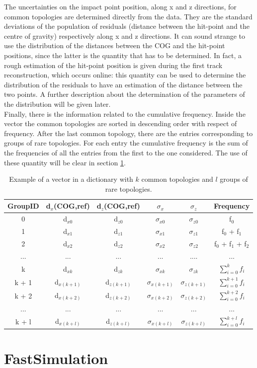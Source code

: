 The uncertainties on the impact point position, along x and z directions, for common topologies are determined directly from the data. They are the standard deviations of the population of residuals (distance between the hit-point and the centre of gravity) respectively along x and z directions. It can sound strange to use the distribution of the distances between the COG and the hit-point positions, since the latter is the quantity that has to be determined. In fact, a rough estimation of the hit-point position is given during the first track reconstruction, which occurs online: this quantity can be used to determine the distribution of the residuals to have an estimation of the distance between the two points. A further description about the determination of the parameters of the distribution will be given later.\\
Finally, there is the information related to the cumulative frequency. Inside the vector the common topologies are sorted in descending order with respect of frequency. After the last common topology, there are the entries corresponding to groups of rare topologies. For each entry the cumulative frequency is the sum of the frequencies of all the entries from the first to the one considered. The use of these quantity will be clear in section \ref{fast}.
%
\begin{table}
\centering
\renewcommand\arraystretch{1.5}
 \begin{tabular}{|c|c|c|c|c|c|}
  \hline
  GroupID & d$_x$(COG,ref) & d$_z$(COG,ref) & $\sigma_x$ & $\sigma_z$ & Frequency\\
  \hline
  0 & d$_{x0}$ & d$_{z0}$ & $\sigma_{x0}$ & $\sigma_{z0}$ & f$_0$\\
  1 & d$_{x1}$ & d$_{z1}$ & $\sigma_{x1}$ & $\sigma_{z1}$ & f$_0$ + f$_1$\\
  2 & d$_{x2}$ & d$_{z2}$ & $\sigma_{x2}$ & $\sigma_{z2}$ & f$_0$ + f$_1$ + f$_2$\\
  ... & ... & ... & ... & .... & ... \\
  k & d$_{xk}$ & d$_{zk}$ & $\sigma_{xk}$ & $\sigma_{zk}$ & $\sum_{i=0}^{k} f_i$ \\
  k + 1 & d$_{x(k+1)}$ & d$_{z(k+1)}$ & $\sigma_{x(k+1)}$ & $\sigma_{z(k+1)}$ & $\sum_{i=0}^{k+1} f_i$\\
  k + 2 & d$_{x(k+2)}$ & d$_{z(k+2)}$ & $\sigma_{x(k+2)}$ & $\sigma_{z(k+2)}$ & $\sum_{i=0}^{k+2} f_i$\\
  ... & ... & ... & ... & ... & ...\\
  k + l & d$_{x(k+l)}$ & d$_{z(k+l)}$ & $\sigma_{x(k+l)}$ & $\sigma_{z(k+l)}$ & $\sum_{i=0}^{k+l} f_i$\\
  \hline
 \end{tabular}
 \caption{Example of a vector in a dictionary with $k$ common topologies and $l$ groups of rare topologies.}
 \label{tab:vec}
\end{table}
%
\section{FastSimulation}
\label{fast}